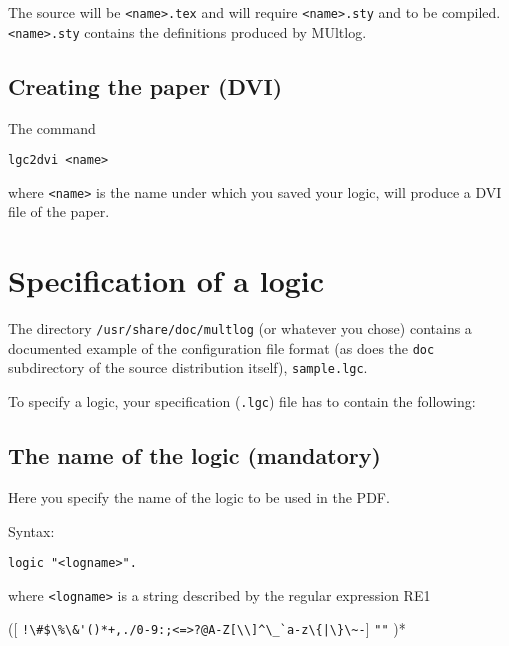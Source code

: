 \documentclass[
]{article}
\newcommand{\passthrough}[1]{#1}
\begin{document}
The source will be \passthrough{\lstinline!<name>.tex!} and will require
\passthrough{\lstinline!<name>.sty!} and to be compiled.
\passthrough{\lstinline!<name>.sty!} contains the definitions produced
by MUltlog.

\hypertarget{creating-the-paper-dvi}{%
\subsection{Creating the paper (DVI)}\label{creating-the-paper-dvi}}

The command

\begin{lstlisting}
lgc2dvi <name>
\end{lstlisting}

where \passthrough{\lstinline!<name>!} is the name under which you saved
your logic, will produce a DVI file of the paper.

\hypertarget{specification-of-a-logic}{%
\section{Specification of a logic}\label{specification-of-a-logic}}

The directory \passthrough{\lstinline!/usr/share/doc/multlog!} (or
whatever you chose) contains a documented example of the configuration
file format (as does the \passthrough{\lstinline!doc!} subdirectory of
the source distribution itself), \passthrough{\lstinline!sample.lgc!}.

To specify a logic, your specification (\passthrough{\lstinline!.lgc!})
file has to contain the following:

\hypertarget{the-name-of-the-logic-mandatory}{%
\subsection{The name of the logic
(mandatory)}\label{the-name-of-the-logic-mandatory}}

Here you specify the name of the logic to be used in the PDF.

Syntax:

\begin{lstlisting}
logic "<logname>".
\end{lstlisting}

where \passthrough{\lstinline!<logname>!} is a string described by the
regular expression RE1

({[}
\passthrough{\lstinline"!\#$\%\&'()*+,./0-9:;<=>?@A-Z[\\]^\_`a-z\{|\}\~-"}{]}
\textbar{} \passthrough{\lstinline!""!} )*
\end{document}
